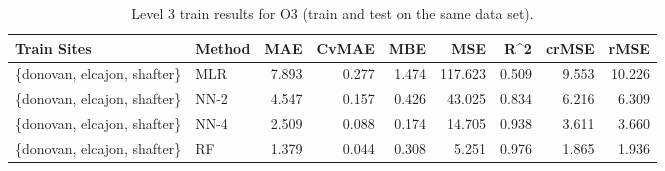 \begin{table}[h]
\begin{tabular}{llrrrrrrr}
\toprule
 Train Sites & Method &   MAE &  CvMAE &       MBE &     MSE &   R\textasciicircum2 &  crMSE &   rMSE \\
\midrule
\{donovan, elcajon, shafter\} & MLR & 7.893 & 0.277 & 1.474 & 117.623 & 0.509 & 9.553 & 10.226\\
\{donovan, elcajon, shafter\} & NN-2 & 4.547 & 0.157 & 0.426 & 43.025 & 0.834 & 6.216 & 6.309\\
\{donovan, elcajon, shafter\} & NN-4 & 2.509 & 0.088 & 0.174 & 14.705 & 0.938 & 3.611 & 3.660\\
\{donovan, elcajon, shafter\} & RF & 1.379 & 0.044 & 0.308 & 5.251 & 0.976 & 1.865 & 1.936\\
\bottomrule
\end{tabular}
\caption{Level 3 train results for O3 (train and test on the same data set).}
\end{table}
